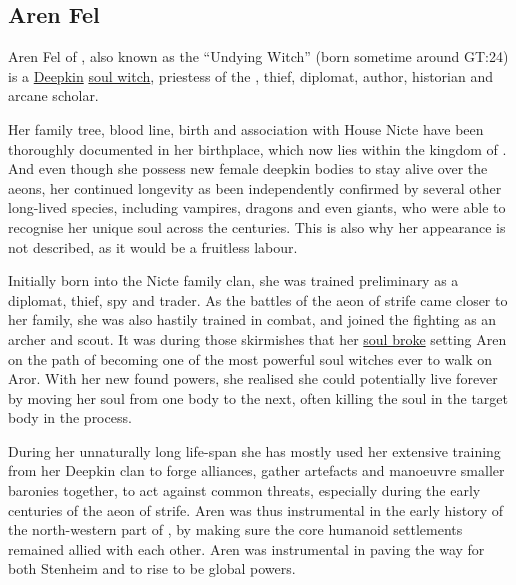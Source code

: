 \subsection{Aren Fel}
\label{sec:Aren Fel}

Aren Fel of , also known as the ``Undying Witch'' (born
sometime around GT:24) is a \hyperref[sec:Deepkin]{Deepkin}
\hyperref[sec:Soul Magic]{soul witch}, priestess of the , thief, diplomat, author, historian and arcane scholar.

Her family tree, blood line, birth and association with House Nicte have been
thoroughly documented in her birthplace, which now lies within the kingdom of
. And even though she possess new female deepkin bodies
to stay alive over the aeons, her continued longevity as been independently
confirmed by several other long-lived species, including vampires, dragons and
even giants, who were able to recognise her unique soul across the centuries.
This is also why her appearance is not described, as it would be a fruitless
labour.

Initially born into the Nicte family clan, she was trained preliminary as a
diplomat, thief, spy and trader. As the battles of the aeon of strife came
closer to her family, she was also hastily trained in combat, and joined the
fighting as an archer and scout. It was during those skirmishes that her
\hyperref[sec:Soul Awakening]{soul broke} setting Aren on the path of becoming
one of the most powerful soul witches ever to walk on Aror. With her new found
powers, she realised she could potentially live forever by moving her soul
from one body to the next, often killing the soul in the target body in the
process.

During her unnaturally long life-span she has mostly used her extensive
training from her Deepkin clan to forge alliances, gather artefacts and
manoeuvre smaller baronies together, to act against common threats, especially
during the early centuries of the aeon of strife. Aren was thus instrumental in
the early history of the north-western part of , by making
sure the core humanoid settlements remained allied with each other. Aren was
instrumental in paving the way for both Stenheim and  to
rise to be global powers.

